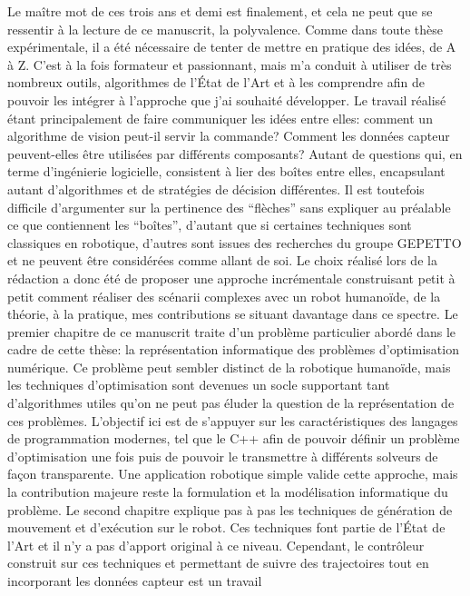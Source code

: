 Le maître mot de ces trois ans et demi est finalement, et cela ne peut
que se ressentir à la lecture de ce manuscrit, la polyvalence. Comme
dans toute thèse expérimentale, il a été nécessaire de tenter de
mettre en pratique des idées, de A à Z. C'est à la fois formateur et
passionnant, mais m'a conduit à utiliser de très nombreux outils,
algorithmes de l'État de l'Art et à les comprendre afin de pouvoir les
intégrer à l'approche que j'ai souhaité développer. Le travail réalisé
étant principalement de faire communiquer les idées entre elles:
comment un algorithme de vision peut-il servir la commande? Comment
les données capteur peuvent-elles être utilisées par différents
composants?  Autant de questions qui, en terme d'ingénierie
logicielle, consistent à lier des boîtes entre elles, encapsulant
autant d'algorithmes et de stratégies de décision différentes. Il est
toutefois difficile d'argumenter sur la pertinence des ``flèches''
sans expliquer au préalable ce que contiennent les ``boîtes'',
d'autant que si certaines techniques sont classiques en robotique,
d'autres sont issues des recherches du groupe GEPETTO et ne peuvent
être considérées comme allant de soi. Le choix réalisé lors de la
rédaction a donc été de proposer une approche incrémentale
construisant petit à petit comment réaliser des scénarii complexes
avec un robot humanoïde, de la théorie, à la pratique, mes
contributions se situant davantage dans ce spectre. Le premier
chapitre de ce manuscrit traite d'un problème particulier abordé dans
le cadre de cette thèse: la représentation informatique des problèmes
d'optimisation numérique. Ce problème peut sembler distinct de la
robotique humanoïde, mais les techniques d'optimisation sont devenues
un socle supportant tant d'algorithmes utiles qu'on ne peut pas éluder
la question de la représentation de ces problèmes. L'objectif ici est
de s'appuyer sur les caractéristiques des langages de programmation
modernes, tel que le C++ afin de pouvoir définir un problème
d'optimisation une fois puis de pouvoir le transmettre à différents
solveurs de façon transparente. Une application robotique simple
valide cette approche, mais la contribution majeure reste la
formulation et la modélisation informatique du problème. Le second
chapitre explique pas à pas les techniques de génération de mouvement
et d'exécution sur le robot. Ces techniques font partie de l'État de
l'Art et il n'y a pas d'apport original à ce niveau. Cependant, le
contrôleur construit sur ces techniques et permettant de suivre des
trajectoires tout en incorporant les données capteur est un travail
